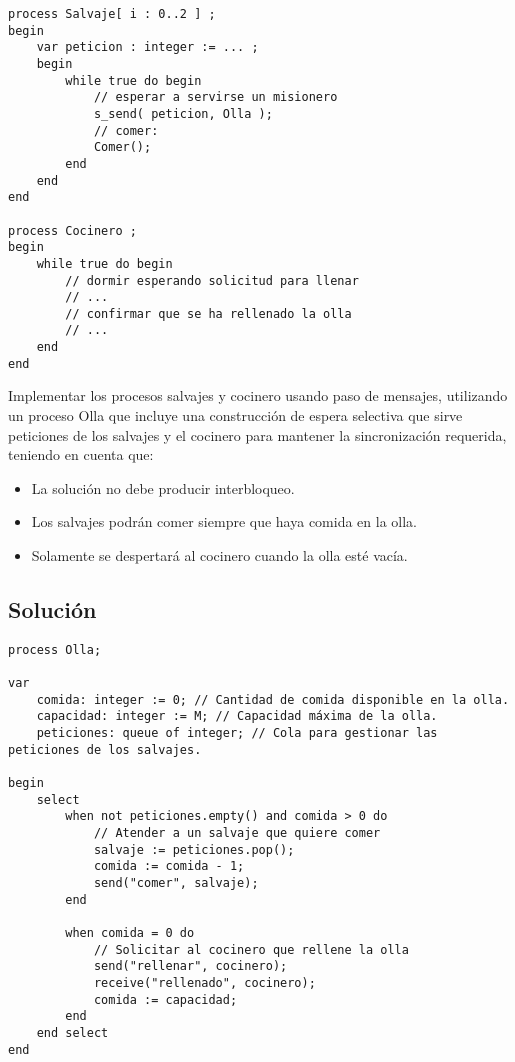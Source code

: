 \documentclass[a4paper,12pt]{article}
\begin{document}
\begin{lstlisting}[style=customcpp]
process Salvaje[ i : 0..2 ] ;
begin
    var peticion : integer := ... ;
    begin
        while true do begin
            // esperar a servirse un misionero
            s_send( peticion, Olla );
            // comer:
            Comer();
        end
    end
end

process Cocinero ;
begin 
    while true do begin
        // dormir esperando solicitud para llenar
        // ...
        // confirmar que se ha rellenado la olla
        // ...
    end
end
\end{lstlisting}

Implementar los procesos salvajes y cocinero usando paso de mensajes, utilizando un proceso Olla que incluye una construcción de espera selectiva que sirve peticiones de los salvajes y el cocinero para mantener la sincronización requerida, teniendo en cuenta que:

\begin{itemize}
    \item La solución no debe producir interbloqueo.
    \item Los salvajes podrán comer siempre que haya comida en la olla.
    \item Solamente se despertará al cocinero cuando la olla esté vacía.
\end{itemize}

\subsection{Solución}

\begin{lstlisting}[style=customcpp, caption={Pseudocódigo del proceso Olla}]
process Olla;

var
    comida: integer := 0; // Cantidad de comida disponible en la olla.
    capacidad: integer := M; // Capacidad máxima de la olla.
    peticiones: queue of integer; // Cola para gestionar las peticiones de los salvajes.

begin
    select
        when not peticiones.empty() and comida > 0 do
            // Atender a un salvaje que quiere comer
            salvaje := peticiones.pop();
            comida := comida - 1;
            send("comer", salvaje);
        end

        when comida = 0 do
            // Solicitar al cocinero que rellene la olla
            send("rellenar", cocinero);
            receive("rellenado", cocinero);
            comida := capacidad;
        end
    end select
end
\end{lstlisting}
\end{document}
